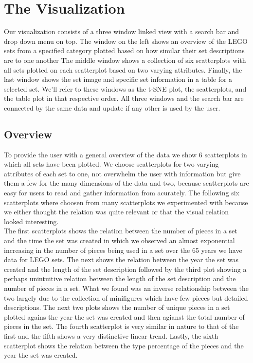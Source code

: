 \documentclass[a4paper, 11pt]{article}
\begin{document}
\section*{The Visualization}

Our visualization consists of a three window linked view with a search bar and drop down menu on top. The window on the left shows an overview of the LEGO sets from a specified category plotted based on how similar their set descriptions are to one another The middle window shows a collection of six scatterplots with all sets plotted on each scatterplot based on two varying attributes. Finally, the last window shows the set image and specific set information in a table for a selected set. We'll refer to these windows as the t-SNE plot, the scatterplots, and the table plot in that respective order. All three windows and the search bar are connected by the same data and update if any other is used by the user.

\subsection*{Overview}

To provide the user with a general overview of the data we show 6 scatterplots in which all sets have been plotted. We choose scatterplots for two varying attributes of  each set to one, not overwhelm the user with information but give them a few for the many dimensions of the data and two, because scatterplots are easy for users to read and gather information from acurately. The following six scatterplots where choosen from many scatterplots we experimented with because we either thought the relation was quite relevant or that the visual relation looked interesting. \\

The first scatterplots shows the relation between the number of pieces in a set and the time the set was created in which we observed an almost exponential increasing in the number of pieces being used in a set over the 65 years we have data for LEGO sets. The next shows the relation between the year the set was created and the length of the set description followed by the third plot showing a perhaps unintuitive relation between the length of the set description and the number of pieces in a set. What we found was an inverse relationship between the two largely due to the collection of minifigures which have few pieces but detailed descriptions. The next two plots shows the number of unique pieces in a set plotted agains the year the set was created  and  then agianst the total number of pieces in the set. The fourth scatterplot is very similar in nature to that of the first and the fifth shows a very distinctive linear trend. Lastly, the sixth scatterplot shows the relation between the type percentage of the pieces and the year the set was created. \\
\end{document}
